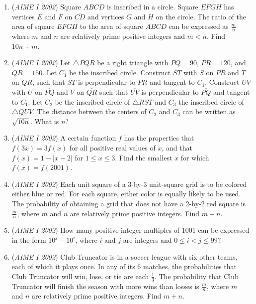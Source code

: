 \begin{enumerate}
 

	\item (\textit{AIME I 2002}) Square $ABCD$ is inscribed in a circle. Square $EFGH$ has vertices $E$ and $F$ on $\overline{CD}$ and vertices $G$ and $H$ on the circle. The ratio of the area of square $EFGH$ to the area of square $ABCD$ can be expressed as $\frac {m}{n}$ where $m$ and $n$ are relatively prime positive integers and $m < n$. Find $10n + m$.


 

	\item (\textit{AIME I 2002}) Let $\triangle{PQR}$ be a right triangle with $PQ = 90$, $PR = 120$, and $QR = 150$. Let $C_{1}$ be the inscribed circle. Construct $\overline{ST}$ with $S$ on $\overline{PR}$ and $T$ on $\overline{QR}$, such that $\overline{ST}$ is perpendicular to $\overline{PR}$ and tangent to $C_{1}$. Construct $\overline{UV}$ with $U$ on $\overline{PQ}$ and $V$ on $\overline{QR}$ such that $\overline{UV}$ is perpendicular to $\overline{PQ}$ and tangent to $C_{1}$. Let $C_{2}$ be the inscribed circle of $\triangle{RST}$ and $C_{3}$ the inscribed circle of $\triangle{QUV}$. The distance between the centers of $C_{2}$ and $C_{3}$ can be written as $\sqrt {10n}$. What is $n$?


 

	\item (\textit{AIME I 2002}) A certain function $f$ has the properties that $f(3x) = 3f(x)$ for all positive real values of $x$, and that $f(x) = 1 - |x - 2|$ for $1\leq x \leq 3$. Find the smallest $x$ for which $f(x) = f(2001)$.


 

	\item (\textit{AIME I 2002}) Each unit square of a 3-by-3 unit-square grid is to be colored either blue or red. For each square, either color is equally likely to be used. The probability of obtaining a grid that does not have a 2-by-2 red square is $\frac {m}{n}$, where $m$ and $n$ are relatively prime positive integers. Find $m + n$.


 

	\item (\textit{AIME I 2002}) How many positive integer multiples of 1001 can be expressed in the form $10^{j} - 10^{i}$, where $i$ and $j$ are integers and $0\leq i < j \leq 99$?


 

	\item (\textit{AIME I 2002}) Club Truncator is in a soccer league with six other teams, each of which it plays once. In any of its 6 matches, the probabilities that Club Truncator will win, lose, or tie are each $\frac {1}{3}$. The probability that Club Truncator will finish the season with more wins than losses is $\frac {m}{n}$, where $m$ and $n$ are relatively prime positive integers. Find $m + n$.



\end{enumerate}
